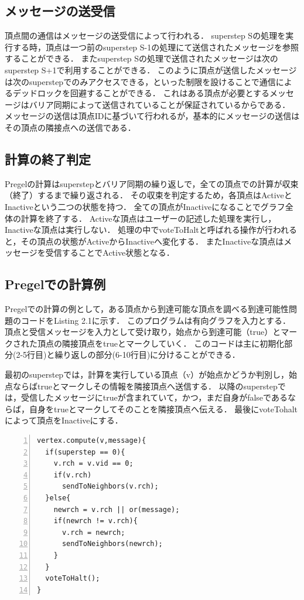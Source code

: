 \documentclass[12pt]{ujreport}
\begin{document}
\subsection{メッセージの送受信}
頂点間の通信はメッセージの送受信によって行われる．
superstep Sの処理を実行する時，頂点は一つ前のsuperstep S-1の処理にて送信されたメッセージを参照することができる．
またsuperstep Sの処理で送信されたメッセージは次のsuperstep S+1で利用することができる．
このように頂点が送信したメッセージは次のsuperstepでのみアクセスできる，といった制限を設けることで通信によるデッドロックを回避することができる．
これはある頂点が必要とするメッセージはバリア同期によって送信されていることが保証されているからである．
メッセージの送信は頂点IDに基づいて行われるが，基本的にメッセージの送信はその頂点の隣接点への送信である．

\subsection{計算の終了判定}
Pregelの計算はsuperstepとバリア同期の繰り返しで，全ての頂点での計算が収束（終了）するまで繰り返される．
その収束を判定するため，各頂点はActiveとInactiveという二つの状態を持つ．
全ての頂点がInactiveになることでグラフ全体の計算を終了する．
Activeな頂点はユーザーの記述した処理を実行し，Inactiveな頂点は実行しない．
処理の中でvoteToHaltと呼ばれる操作が行われると，その頂点の状態がActiveからInactiveへ変化する．
またInactiveな頂点はメッセージを受信することでActive状態となる．

\subsection{Pregelでの計算例}
Pregelでの計算の例として，ある頂点から到達可能な頂点を調べる到達可能性問題のコードをListing 2.1に示す．
このプログラムは有向グラフを入力とする．
頂点と受信メッセージを入力として受け取り，始点から到達可能（true）とマークされた頂点の隣接頂点をtrueとマークしていく．
このコードは主に初期化部分(2-5行目)と繰り返しの部分(6-10行目)に分けることができる．

最初のsuperstepでは，計算を実行している頂点（v）が始点かどうか判別し，始点ならばtrueとマークしその情報を隣接頂点へ送信する．
以降のsuperstepでは，受信したメッセージにtrueが含まれていて，かつ，まだ自身がfalseであるならば，自身をtrueとマークしてそのことを隣接頂点へ伝える．
最後にvoteTohaltによって頂点をInactiveにする．
\begin{lstlisting}[basicstyle=\ttfamily\footnotesize, frame = single,  numbers = left, tabsize = 3, captionpos = b, caption = {Pregelのプログラム例}]
vertex.compute(v,message){
  if(superstep == 0){
    v.rch = v.vid == 0;
    if(v.rch)
      sendToNeighbors(v.rch);
  }else{
    newrch = v.rch || or(message);
    if(newrch != v.rch){
      v.rch = newrch;
      sendToNeighbors(newrch);
    }
  }
  voteToHalt();
}
\end{lstlisting}
\end{document}
